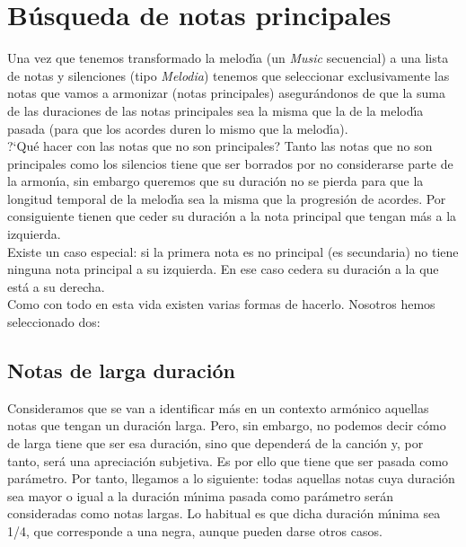 \documentclass[a4paper]{report}
\begin{document}
\section{B\'usqueda de notas principales}
Una vez que tenemos transformado la melod\'\i a (un \emph{Music} secuencial)
a una lista de notas y silenciones (tipo \emph{Melodia}) tenemos que
seleccionar exclusivamente las notas que vamos a armonizar
(notas principales) asegur\'andonos de que la suma de las
duraciones de las notas principales sea la misma que la de la
melod\'\i a pasada (para que los acordes duren lo mismo que la
melod\'\i a).\\
\indent ?`Qu\'e hacer con las notas que no son principales? Tanto las notas que 
no son principales como los silencios tiene que ser borrados por no 
considerarse parte de la armon\'\i a, sin embargo queremos
que su duraci\'on no se pierda para que la longitud temporal de 
la melod\'\i a sea la misma que la progresi\'on de acordes. Por consiguiente tienen
que ceder su duraci\'on a la nota principal que tengan m\'as a la izquierda.\\
\indent Existe un caso especial: si la primera nota es no principal (es secundaria)
no tiene ninguna nota principal a su izquierda. En ese caso cedera 
su duraci\'on a la que est\'a a su derecha.\\
Como con todo en esta vida existen varias formas de hacerlo. Nosotros
hemos seleccionado dos:

\subsection{Notas de larga duraci\'on}
Consideramos que se van a identificar m\'as en un contexto arm\'onico 
aquellas notas que tengan un duraci\'on larga. Pero, sin embargo,
no podemos decir c\'omo de larga tiene que ser esa duraci\'on, sino que depender\'a de la
canci\'on y, por tanto, ser\'a una apreciaci\'on subjetiva. Es por ello
que tiene que ser pasada como par\'ametro. Por tanto, llegamos a lo siguiente: todas aquellas notas
cuya duraci\'on sea mayor o igual a la duraci\'on m\'\i nima
pasada como par\'ametro ser\'an consideradas como notas largas. Lo 
habitual es que dicha duraci\'on m\'\i nima sea 1/4, que corresponde
a una negra, aunque pueden darse otros casos.
\end{document}
